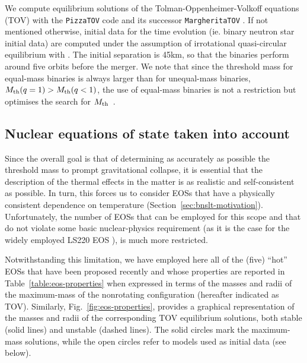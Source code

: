We compute equilibrium solutions of the Tolman-Oppenheimer-Volkoff equations 
(TOV) with the \texttt{PizzaTOV} code \cite{Kastaun2007} and its successor 
\texttt{MargheritaTOV} \cite{Most2018b}.
%
If not mentioned otherwise, initial data for the time evolution
(ie. binary neutron star initial data) are computed under the assumption
of irrotational quasi-circular equilibrium  with 
\cite{Bonazzola98b, Gourgoulhon01,Damour:2002qh}. The initial
separation is 45km, so that the binaries perform around five orbits before the
merger. We note that since
the threshold mass for equal-mass binaries is always larger than for
unequal-mass binaries, \ie $M_\textrm{th}(q=1) > M_\textrm{th}(q<1)$, the use
of equal-mass binaries is not a restriction but optimises the search for
$M_\textrm{th}$~\cite{Bauswein2017b}.

\subsection{Nuclear equations of state taken into account}
Since the overall goal is that of determining as accurately as
possible the threshold mass to prompt gravitational collapse, it is
essential that the description of the thermal effects in the matter is as
realistic and self-consistent as possible. In turn, this forces us to
consider EOSs that have a physically consistent dependence on
temperature (Section~\ref{sec:bnslt-motivation}).
Unfortunately, the number of EOSs that can be employed for
this scope and that do not violate some basic nuclear-physics requirement
(as it is the case for the widely employed LS220
EOS \cite{Lattimer91,Kolomeitsev2016}), is much more restricted.

Notwithstanding this limitation, we have employed here all of the (five)
``hot'' EOSs that have been proposed recently and whose properties are
reported in Table~\ref{table:eos-properties} when expressed in terms of
the masses and radii of the maximum-mass of the nonrotating configuration
(hereafter indicated as TOV). Similarly, Fig.~\ref{fig:eos-properties},
provides a graphical representation of the masses and radii of the
corresponding TOV equilibrium solutions, both stable (solid lines) and
unstable (dashed lines). The solid circles mark the
maximum-mass solutions, while the open circles refer to models used as
initial data (see below).

